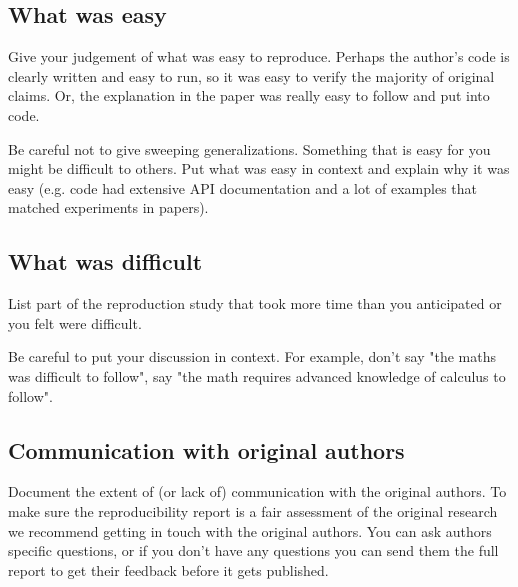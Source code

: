 \subsection{What was easy}
Give your judgement of what was easy to reproduce. Perhaps the author's code is clearly written and easy to run, so it was easy to verify the majority of original claims. Or, the explanation in the paper was really easy to follow and put into code. 

Be careful not to give sweeping generalizations. Something that is easy for you might be difficult to others. Put what was easy in context and explain why it was easy (e.g. code had extensive API documentation and a lot of examples that matched experiments in papers). 

\subsection{What was difficult}
List part of the reproduction study that took more time than you anticipated or you felt were difficult. 

Be careful to put your discussion in context. For example, don't say "the maths was difficult to follow", say "the math requires advanced knowledge of calculus to follow". 

\subsection{Communication with original authors}
Document the extent of (or lack of) communication with the original authors. To make sure the reproducibility report is a fair assessment of the original research we recommend getting in touch with the original authors. You can ask authors specific questions, or if you don't have any questions you can send them the full report to get their feedback before it gets published. 
